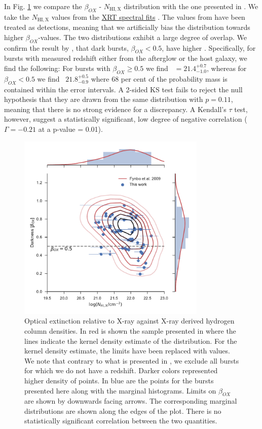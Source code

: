 \documentclass{aa}    %
\begin{document}
In Fig. \ref{fig:betaOX} we compare the $\beta_{OX}$ - $N_{\mathrm{HI, X}}$
distribution with the one presented in \citet{Fynbo2009}. We take the
$N_{\mathrm{HI,X}}$ values from the
\href{http://www.swift.ac.uk/xrt_spectra}{XRT spectral fits} \citep{Evans2009}.
The values from \citet{Fynbo2009} have been treated as detections, meaning that
we artificially bias the distribution towards higher $\beta_{OX}$-values. The
two distributions exhibit a large degree of overlap. We confirm the
result by \citet{Fynbo2009}, that dark bursts, $\beta_{OX} < 0.5$, have higher
\nhx. Specifically, for bursts with measured redshift either from the afterglow
or the host galaxy, we find the following: For bursts with $\beta_{OX} \geq 0.5$
we find \nhx~$ = 21.4_{-1.0}^{+0.7}$, whereas for $\beta_{OX} < 0.5$ we find
\nhx~$21.8_{-0.9}^{+0.5}$ where 68 per cent of the probability mass is contained
within the error intervals. A 2-sided KS test fails to reject the null
hypothesis that they are drawn from the same distribution with $p = 0.11$,
meaning that there is no strong evidence for a discrepancy. A Kendall's $\tau$
test, however, suggest a statistically significant, low degree of negative
correlation ($\Gamma = -0.21$ at a p-value = 0.01).

\begin{figure}[!ht]
	\centerline{\includegraphics[width=9cm]{figures/betaOX.pdf}} \caption{Optical
	extinction relative to X-ray against X-ray derived hydrogen column densities.
	In red is shown the sample presented in \citet{Fynbo2009} where the lines
	indicate the kernel density estimate of the distribution. For the kernel
	density estimate, the limits have been replaced with values. We note that
	contrary to what is presented in \citet{Fynbo2009}, we exclude all bursts for
	which we do not have a redshift. Darker colors represented higher density of
	points. In blue are the points for the bursts presented here along with the
	marginal histograms. Limits on $\beta_{OX}$ are shown by downwards facing
	arrows. The corresponding marginal distributions are shown along the edges of
	the plot. There is no statistically significant correlation between the two
	quantities.} \label{fig:betaOX}
\end{figure}
\end{document}
